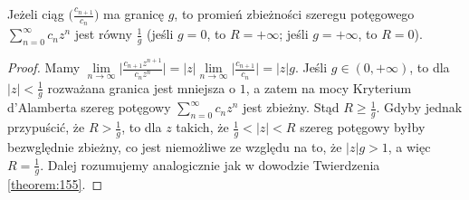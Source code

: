 \documentclass[leqno]{article}
\begin{document}
\begin{justify}
\begin{theorem}
{
    Jeżeli ciąg $\Big(\frac{c_{n+1}}{c_n}\Big)$ ma granicę $g$, to promień zbieżności szeregu potęgowego $\sum\limits_{n=0}^{\infty}c_n z^n$ jest równy
    $\frac{1}{g}$ (jeśli $g = 0$, to $R = +\infty$; jeśli $g = +\infty$, to $R = 0$).
}
\end{theorem}

\begin{proof}
    Mamy $\lim\limits_{n \to \infty} \Big|\frac{c_{n+1}z^{n+1}}{c_n z^n}\Big| = |z| \lim\limits_{n \to \infty}\Big|\frac{c_{n+1}}{c_n}\Big| = |z|g$. 
    Jeśli $g \in (0, +\infty)$, to dla $|z| < \frac{1}{g}$ rozważana granica jest mniejsza o $1$, a zatem na mocy Kryterium d'Alamberta szereg potęgowy $\sum\limits_{n=0}^{\infty}c_n z^n$
    jest zbieżny. Stąd $R \geqslant \frac{1}{g}$. Gdyby jednak przypuścić, że $R > \frac{1}{g}$, to dla $z$ takich, że $\frac{1}{g} < |z| < R$ 
    szereg potęgowy byłby bezwględnie zbieżny, co jest niemożliwe ze względu na to, że $|z|g > 1$, a więc $R = \frac{1}{g}$. Dalej rozumujemy analogicznie jak w dowodzie
    Twierdzenia \ref{theorem:155}.
\end{proof}


\end{justify}
\end{document}
